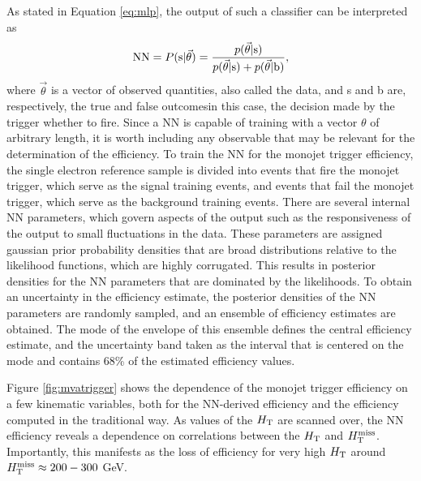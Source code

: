 As stated in Equation \ref{eq:mlp}, the output of such a classifier can be interpreted as
\begin{equation}
\text{NN} = P(\text{s}|\vec{\theta}) = \frac{p(\vec{\theta} | {\rm s})}{p(\vec{\theta} | {\rm s})+p(\vec{\theta} | {\rm b})},
\end{equation}
where $\vec{\theta}$ is a vector of observed quantities, also called the data, and s and b are, respectively, the true and false outcomes\textemdash in this case, the decision made by the trigger whether to fire. Since a NN is capable of training with a vector $\theta$ of arbitrary length, it is worth including any observable that may be relevant for the determination of the efficiency. To train the NN for the monojet trigger efficiency, the single electron reference sample is divided into events that fire the monojet trigger, which serve as the signal training events, and events that fail the monojet trigger, which serve as the background training events. There are several internal NN parameters, which govern aspects of the output such as the responsiveness of the output to small fluctuations in the data. These parameters are assigned gaussian prior probability densities that are broad distributions relative to the likelihood functions, which are highly corrugated. This results in posterior densities for the NN parameters that are dominated by the likelihoods. To obtain an uncertainty in the efficiency estimate, the posterior densities of the NN parameters are randomly sampled, and an ensemble of efficiency estimates are obtained. The mode of the envelope of this ensemble defines the central efficiency estimate, and the uncertainty band taken as the interval that is centered on the mode and contains 68\% of the estimated efficiency values. 

Figure \ref{fig:mvatrigger} shows the dependence of the monojet trigger efficiency on a few kinematic variables, both for the NN-derived efficiency and the efficiency computed in the traditional way. As values of the $H_{\rm T}$ are scanned over, the NN efficiency reveals a dependence on correlations between the $H_{\rm T}$ and $H_{\text{T}}^{\rm miss}$. Importantly, this manifests as the loss of efficiency for very high $H_{\rm T}$ around $H_{\text{T}}^{\rm miss}\approx200-300$ GeV.

